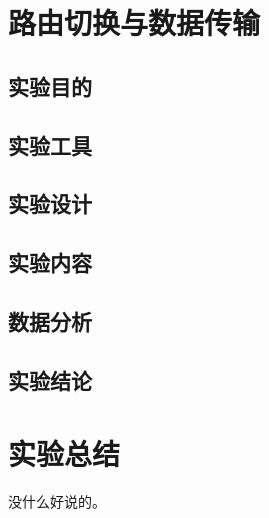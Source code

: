 \documentclass[a4paper,12pt]{report}
\begin{document}
\chapter{路由切换与数据传输}

\begin{spacing}{1.5}
\section{实验目的}

\section{实验工具}

\section{实验设计}

\section{实验内容}

\section{数据分析}

\section{实验结论}

\end{spacing}

\chapter{实验总结}
\begin{spacing}{1.5}
	没什么好说的。
\end{spacing}

\end{document}
